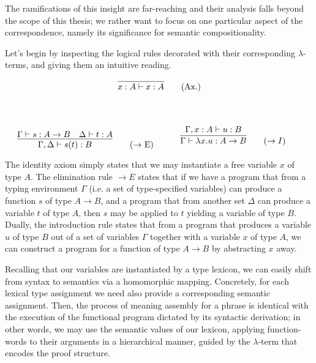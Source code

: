The ramifications of this insight are far-reaching and their analysis falls beyond the scope of this thesis; we rather want to focus on one particular aspect of the correspondence, namely its significance for semantic compositionality.

Let's begin by inspecting the logical rules decorated with their corresponding $\lambda$-terms, and giving them an intuitive reading.

\begin{center}
\begin{minipage}{0.5\textwidth}
\[
\infer{x: A \vdash x: A}{}\tag{Ax.}
\]
\end{minipage}\\
\end{center}
\begin{align*}
    \begin{minipage}{0.5\textwidth}
	\[
        \infer{\Gamma, \Delta \vdash s(t): B}{
            \Gamma \vdash s: A \rightarrow B
            &
            \Delta \vdash t: A
        }\tag{$\rightarrow$ E}
    \]
    \end{minipage}
    \begin{minipage}{0.5\textwidth}
    \[
        \infer{\Gamma \vdash \lambda x. u : A \rightarrow B}{
            \Gamma, x: A \vdash u: B
        }\tag{$\rightarrow I$}\\
    \]
    \end{minipage}
\end{align*}

The identity axiom simply states that we may instantiate a free variable $x$ of type $A$.
The elimination rule $\rightarrow E$ states that if we have a program that from a typing environment $\Gamma$ (i.e. a set of type-specified variables) can produce a function $s$ of type $A \to B$, and a program that from another set $\Delta$ can produce a variable $t$ of type $A$, then $s$ may be applied to $t$ yielding a variable of type $B$.
Dually, the introduction rule states that from a program that produces a variable $u$ of type $B$ out of a set of variables $\Gamma$ together with a variable $x$ of type $A$, we can construct a program for a function of type $A\to B$ by abstracting $x$ away.

Recalling that our variables are instantiated by a type lexicon, we can easily shift from syntax to semantics via a homomorphic mapping.
Concretely, for each lexical type assignment we need also provide a corresponding semantic assignment.
Then, the process of meaning assembly for a phrase is identical with the execution of the functional program dictated by its syntactic derivation; in other words, we may use the semantic values of our lexicon, applying function-words to their arguments in a hierarchical manner, guided by the $\lambda$-term that encodes the proof structure.


